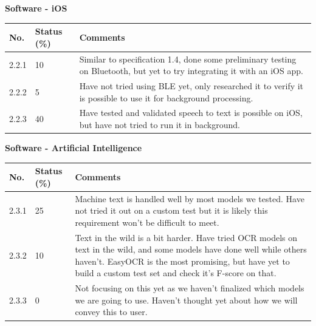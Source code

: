 \documentclass[a4paper,11pt]{article}
\begin{document}
\noindent
\textbf{Software - iOS}
\begin{table}[ht]
    \centering
    \begin{tabular}{|p{0.7cm}|p{1cm}|p{10cm}|}
        \hline
        No. & Status (\%) & Comments \\ \hline
        
        2.2.1 & 10 & Similar to specification 1.4, done some preliminary testing on Bluetooth, but yet to try integrating it with an iOS app. \\ \hline
        
        2.2.2 & 5 & Have not tried using BLE yet, only researched it to verify it is possible to use it for background processing. \\ \hline
        
        2.2.3 & 40 & Have tested and validated speech to text is possible on iOS, but have not tried to run it in background. \\ \hline
    \end{tabular}
\end{table}

\newpage
\noindent
\textbf{Software - Artificial Intelligence}
\begin{table}[ht]
    \centering
    \begin{tabular}{|p{0.7cm}|p{1cm}|p{10cm}|}
        \hline
        No. & Status (\%) & Comments \\ \hline
        
        2.3.1 & 25 & Machine text is handled well by most models we tested. Have not tried it out on a custom test but it is likely this requirement won't be difficult to meet. \\ \hline
        
        2.3.2 & 10 & Text in the wild is a bit harder. Have tried OCR models on text in the wild, and some models have done well while others haven't. EasyOCR is the most promising, but have yet to build a custom test set and check it's F-score on that. \\ \hline
        
        2.3.3 & 0 & Not focusing on this yet as we haven't finalized which models we are going to use. Haven't thought yet about how we will convey this to user. \\ \hline
    \end{tabular}
\end{table}
\end{document}

